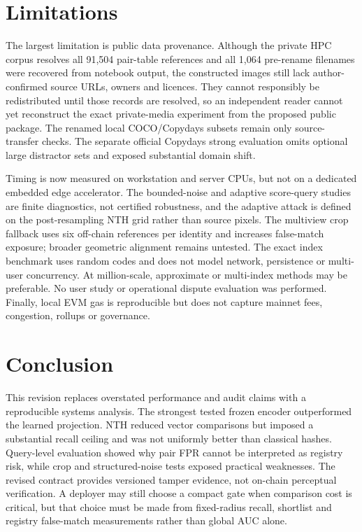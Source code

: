 \documentclass[12pt]{article}
\begin{document}
\color{black}
\section{Limitations}
\color{revisionred}

The largest limitation is public data provenance. Although the private HPC corpus resolves all 91,504 pair-table references and all 1,064 pre-rename filenames were recovered from notebook output, the constructed images still lack author-confirmed source URLs, owners and licences. They cannot responsibly be redistributed until those records are resolved, so an independent reader cannot yet reconstruct the exact private-media experiment from the proposed public package. The renamed local COCO/Copydays subsets remain only source-transfer checks. The separate official Copydays strong evaluation omits optional large distractor sets and exposed substantial domain shift.

Timing is now measured on workstation and server CPUs, but not on a dedicated embedded edge accelerator. The bounded-noise and adaptive score-query studies are finite diagnostics, not certified robustness, and the adaptive attack is defined on the post-resampling NTH grid rather than source pixels. The multiview crop fallback uses six off-chain references per identity and increases false-match exposure; broader geometric alignment remains untested. The exact index benchmark uses random codes and does not model network, persistence or multi-user concurrency. At million-scale, approximate or multi-index methods may be preferable. No user study or operational dispute evaluation was performed. Finally, local EVM gas is reproducible but does not capture mainnet fees, congestion, rollups or governance.

\color{black}
\section{Conclusion}
\color{revisionred}

This revision replaces overstated performance and audit claims with a reproducible systems analysis. The strongest tested frozen encoder outperformed the learned projection. NTH reduced vector comparisons but imposed a substantial recall ceiling and was not uniformly better than classical hashes. Query-level evaluation showed why pair FPR cannot be interpreted as registry risk, while crop and structured-noise tests exposed practical weaknesses. The revised contract provides versioned tamper evidence, not on-chain perceptual verification. A deployer may still choose a compact gate when comparison cost is critical, but that choice must be made from fixed-radius recall, shortlist and registry false-match measurements rather than global AUC alone.
\end{document}
